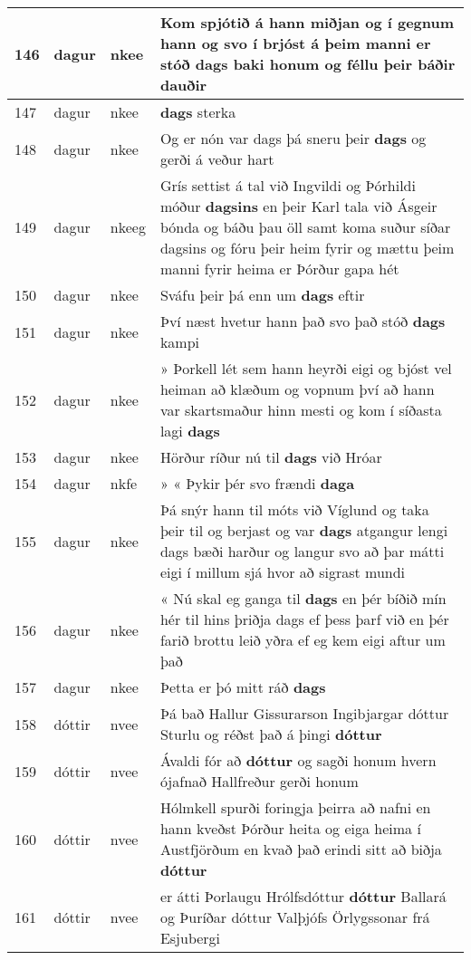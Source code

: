 \documentclass{article}
\begin{document}
\begin{longtable}{p{1cm}|p{1cm}|p{1cm}|p{13cm}}
\hline
146&dagur&nkee&Kom spjótið á hann miðjan og í gegnum hann og svo í brjóst á þeim manni er stóð \textbf{dags} baki honum og féllu þeir báðir dauðir\\
\hline
147&dagur&nkee& \textbf{dags} sterka\\
\hline
148&dagur&nkee&Og er nón var dags þá sneru þeir \textbf{dags} og gerði á veður hart\\
\hline
149&dagur&nkeeg&Grís settist á tal við Ingvildi og Þórhildi móður \textbf{dagsins} en þeir Karl tala við Ásgeir bónda og báðu þau öll samt koma suður síðar dagsins og fóru þeir heim fyrir og mættu þeim manni fyrir heima er Þórður gapa hét\\
\hline
150&dagur&nkee&Sváfu þeir þá enn um \textbf{dags} eftir\\
\hline
151&dagur&nkee&Því næst hvetur hann það svo það stóð \textbf{dags} kampi\\
\hline
152&dagur&nkee&» Þorkell lét sem hann heyrði eigi og bjóst vel heiman að klæðum og vopnum því að hann var skartsmaður hinn mesti og kom í síðasta lagi \textbf{dags} \\
\hline
153&dagur&nkee&Hörður ríður nú til \textbf{dags} við Hróar\\
\hline
154&dagur&nkfe&» « Þykir þér svo frændi \textbf{daga} \\
\hline
155&dagur&nkee&Þá snýr hann til móts við Víglund og taka þeir til og berjast og var \textbf{dags} atgangur lengi dags bæði harður og langur svo að þar mátti eigi í millum sjá hvor að sigrast mundi\\
\hline
156&dagur&nkee&« Nú skal eg ganga til \textbf{dags} en þér bíðið mín hér til hins þriðja dags ef þess þarf við en þér farið brottu leið yðra ef eg kem eigi aftur um það\\
\hline
157&dagur&nkee&Þetta er þó mitt ráð \textbf{dags} \\
\hline
158&dóttir&nvee&Þá bað Hallur Gissurarson Ingibjargar dóttur Sturlu og réðst það á þingi \textbf{dóttur} \\
\hline
159&dóttir&nvee&Ávaldi fór að \textbf{dóttur} og sagði honum hvern ójafnað Hallfreður gerði honum\\
\hline
160&dóttir&nvee&Hólmkell spurði foringja þeirra að nafni en hann kveðst Þórður heita og eiga heima í Austfjörðum en kvað það erindi sitt að biðja \textbf{dóttur} \\
\hline
161&dóttir&nvee&er átti Þorlaugu Hrólfsdóttur \textbf{dóttur} Ballará og Þuríðar dóttur Valþjófs Örlygssonar frá Esjubergi\\

\end{longtable}
\end{document}
